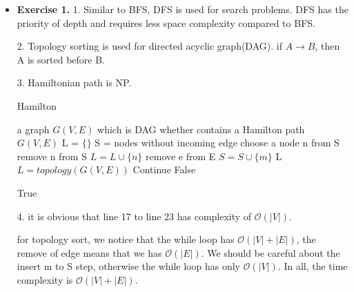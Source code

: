 \documentclass{article}
\newcommand{\bigO}{\mathcal{O}}
\begin{document}
\noindent

\noindent{}

\begin{itemize}

\item \textbf{Exercise 1.}
1. Similar to BFS, DFS is used for search problems. DFS has the priority of depth and requires less space complexity compared to BFS. 

2. Topology sorting is used for directed acyclic graph(DAG). if $A\to B$, then A is sorted before B.

3. Hamiltonian path is NP. 

\begin{algorithm}[H]  
    \caption{Hamilton}  
    \begin{algorithmic}[1]  
        \Require a graph $G(V, E)$ which is DAG
        \Ensure whether contains a Hamilton path
         {$G(V, E)$}
        	\State L = $\{\}$
        	\State S = nodes without incoming edge
        		\State choose a node n from S
        		\State remove n from S
        		\State $L = L \cup \{n\}$
        			\State remove e from E
        				\State $S = S \cup \{m\}$
        			\EndIf
        		\EndFor
        	\EndWhile
        	\State \Return L
        \EndFunction
        \State $L = topology(G(V, E))$
       			\State Continue
       		\Else
        		\State \Return False
        	\EndIf
        \EndFor

        \Return True
            
    \end{algorithmic}  
\end{algorithm}

4. it is obvious that line 17 to line 23 has complexity of $\bigO (|V|)$.

for topology sort, we notice that the while loop has $\bigO (|V| + |E|)$, the remove of edge means that we has $\bigO (|E|)$. We should be careful about the insert m to S step, otherwise the while loop has only $\bigO (|V|)$. In all, the time complexity is $\bigO (|V| + |E|)$.


\end{itemize}
\end{document}
